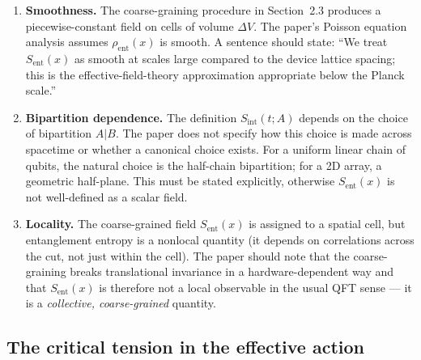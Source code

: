 \documentclass[12pt,letterpaper]{article}
\theoremstyle{plain}
\theoremstyle{definition}
\theoremstyle{remark}
\newcommand{\Sent}{S_{\mathrm{ent}}}
\newcommand{\sint}{S_{\mathrm{int}}}
\begin{document}
\begin{enumerate}
\item \textbf{Smoothness.} The coarse-graining procedure in Section~2.3 produces a piecewise-constant field on cells of volume $\Delta V$. The paper's Poisson equation analysis assumes $\rho_{\mathrm{ent}}(x)$ is smooth. A sentence should state: ``We treat $\Sent(x)$ as smooth at scales large compared to the device lattice spacing; this is the effective-field-theory approximation appropriate below the Planck scale.''

\item \textbf{Bipartition dependence.} The definition $\sint(t;A)$ depends on the choice of bipartition $A|B$. The paper does not specify how this choice is made across spacetime or whether a canonical choice exists. For a uniform linear chain of qubits, the natural choice is the half-chain bipartition; for a 2D array, a geometric half-plane. This must be stated explicitly, otherwise $\Sent(x)$ is not well-defined as a scalar field.

\item \textbf{Locality.} The coarse-grained field $\Sent(x)$ is assigned to a spatial cell, but entanglement entropy is a nonlocal quantity (it depends on correlations across the cut, not just within the cell). The paper should note that the coarse-graining breaks translational invariance in a hardware-dependent way and that $\Sent(x)$ is therefore not a local observable in the usual QFT sense --- it is a \emph{collective, coarse-grained} quantity.
\end{enumerate}

\subsection{The critical tension in the effective action}
\end{document}
